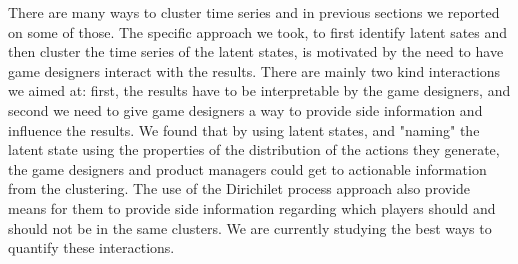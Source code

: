 
There are many ways to cluster time series and in previous sections we reported on some of those. The specific approach we took, to first identify latent sates and then cluster the time series of the latent states, is motivated by the need to have game designers interact with the results.  There are mainly two kind interactions we aimed at: first, the results have to be interpretable by the game designers, and second we need to give game designers a way to provide side information and influence the results.  We found that by using latent states, and "naming" the latent state using the properties of the distribution of the actions they generate, the game designers and product managers could get to actionable information from the clustering.  The use of the Dirichilet process approach also provide means for them to provide side information regarding which players should and should not be in the same clusters.  We are currently studying the best ways to quantify these interactions. 


